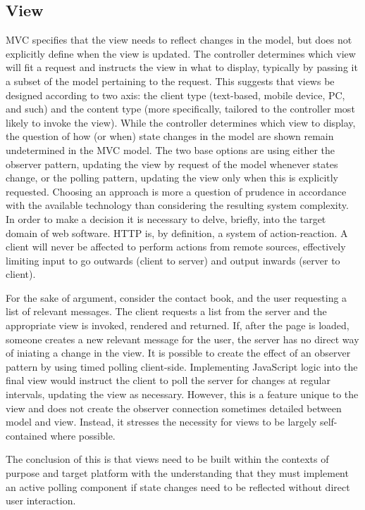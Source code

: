 \subsection{View}
MVC specifies that the view needs to reflect changes in the model, but does not explicitly define when the view is updated.
The controller determines which view will fit a request and instructs the view in what to display, typically by passing it a subset of the model pertaining to the request. This suggests that views be designed according to two axis: the client type (text-based, mobile device, PC, and such) and the content type (more specifically, tailored to the controller most likely to invoke the view). While the controller determines which view to display, the question of how (or when) state changes in the model are shown remain undetermined in the MVC model. The two base options are using either the observer pattern, updating the view by request of the model whenever states change, or the polling pattern, updating the view only when this is explicitly requested. Choosing an approach is more a question of prudence in accordance with the available technology than considering the resulting system complexity. In order to make a decision it is necessary to delve, briefly, into the target domain of web software. HTTP is, by definition, a system of action-reaction. A client will never be affected to perform actions from remote sources, effectively limiting input to go outwards (client to server) and output inwards (server to client).

For the sake of argument, consider the contact book, and the user requesting a list of relevant messages. The client requests a list from the server and the appropriate view is invoked, rendered and returned. If, after the page is loaded, someone creates a new relevant message for the user, the server has no direct way of iniating a change in the view.
It is possible to create the effect of an observer pattern by using timed polling client-side. Implementing JavaScript logic into the final view would instruct the client to poll the server for changes at regular intervals, updating the view as necessary. However, this is a feature unique to the view and does not create the observer connection sometimes detailed between model and view. Instead, it stresses the necessity for views to be largely self-contained where possible.

The conclusion of this is that views need to be built within the contexts of purpose and target platform with the understanding that they must implement an active polling component if state changes need to be reflected without direct user interaction.
